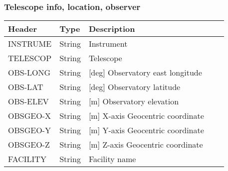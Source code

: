 \subsubsection{Telescope info, location, observer}
\begin{tabular}{l l l l l}

\hline
Header & Type & Description \\
\hline
INSTRUME & String & Instrument \\
TELESCOP & String & Telescope \\
OBS-LONG & String & [deg] Observatory east longitude \\
OBS-LAT & String & [deg] Observatory latitude \\
OBS-ELEV & String & [m] Observatory elevation \\
OBSGEO-X & String & [m] X-axis Geocentric coordinate \\
OBSGEO-Y & String & [m] Y-axis Geocentric coordinate \\
OBSGEO-Z & String & [m] Z-axis Geocentric coordinate \\
FACILITY & String & Facility name \\
\hline
\end{tabular}


